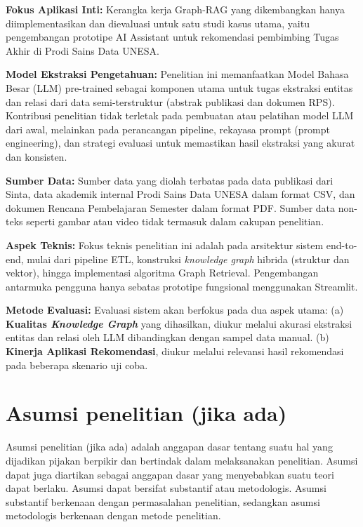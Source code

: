\begin{daftar}
	\item \textbf{Fokus Aplikasi Inti:} Kerangka kerja Graph-RAG yang dikembangkan hanya diimplementasikan dan dievaluasi untuk satu studi kasus utama, yaitu pengembangan prototipe AI Assistant untuk rekomendasi pembimbing Tugas Akhir di Prodi Sains Data UNESA.
	\item \textbf{Model Ekstraksi Pengetahuan:} Penelitian ini memanfaatkan Model Bahasa Besar (LLM) pre-trained sebagai komponen utama untuk tugas ekstraksi entitas dan relasi dari data semi-terstruktur (abstrak publikasi dan dokumen RPS). Kontribusi penelitian tidak terletak pada pembuatan atau pelatihan model LLM dari awal, melainkan pada perancangan pipeline, rekayasa prompt (prompt engineering), dan strategi evaluasi untuk memastikan hasil ekstraksi yang akurat dan konsisten.
	\item \textbf{Sumber Data:} Sumber data yang diolah terbatas pada data publikasi dari Sinta, data akademik internal Prodi Sains Data UNESA dalam format CSV, dan dokumen Rencana Pembelajaran Semester dalam format PDF. Sumber data non-teks seperti gambar atau video tidak termasuk dalam cakupan penelitian.
	\item \textbf{Aspek Teknis:} Fokus teknis penelitian ini adalah pada arsitektur sistem end-to-end, mulai dari pipeline ETL, konstruksi \textit{knowledge graph} hibrida (struktur dan vektor), hingga implementasi algoritma Graph Retrieval. Pengembangan antarmuka pengguna hanya sebatas prototipe fungsional menggunakan Streamlit.
	\item \textbf{Metode Evaluasi:} Evaluasi sistem akan berfokus pada dua aspek utama: (a) \textbf{Kualitas \textit{Knowledge Graph}} yang dihasilkan, diukur melalui akurasi ekstraksi entitas dan relasi oleh LLM dibandingkan dengan sampel data manual. (b) \textbf{Kinerja Aplikasi Rekomendasi}, diukur melalui relevansi hasil rekomendasi pada beberapa skenario uji coba.
\end{daftar}

\section{Asumsi penelitian (jika ada)}

Asumsi penelitian (jika ada) adalah anggapan dasar tentang suatu hal yang dijadikan pijakan berpikir dan bertindak dalam melaksanakan penelitian. Asumsi dapat juga diartikan sebagai anggapan dasar yang menyebabkan suatu teori dapat berlaku. Asumsi dapat bersifat substantif atau metodologis. Asumsi substantif berkenaan dengan permasalahan penelitian, sedangkan asumsi metodologis berkenaan dengan metode penelitian.